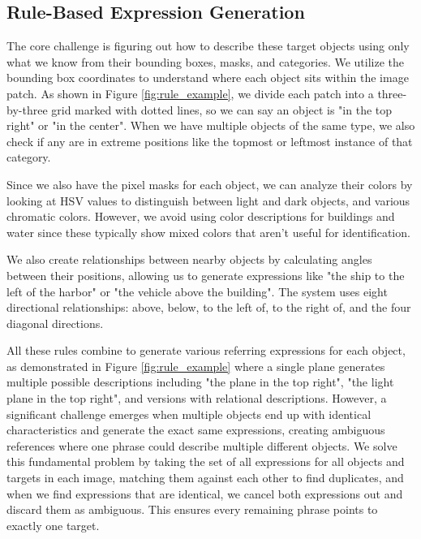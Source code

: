 \subsection{Rule-Based Expression Generation}

The core challenge is figuring out how to describe these target objects using only what we know from their bounding boxes, masks, and categories. We utilize the bounding box coordinates to understand where each object sits within the image patch. As shown in Figure \ref{fig:rule_example}, we divide each patch into a three-by-three grid marked with dotted lines, so we can say an object is "in the top right" or "in the center". When we have multiple objects of the same type, we also check if any are in extreme positions like the topmost or leftmost instance of that category.

Since we also have the pixel masks for each object, we can analyze their colors by looking at HSV values to distinguish between light and dark objects, and various chromatic colors. However, we avoid using color descriptions for buildings and water since these typically show mixed colors that aren't useful for identification.

We also create relationships between nearby objects by calculating angles between their positions, allowing us to generate expressions like "the ship to the left of the harbor" or "the vehicle above the building". The system uses eight directional relationships: above, below, to the left of, to the right of, and the four diagonal directions.

All these rules combine to generate various referring expressions for each object, as demonstrated in Figure \ref{fig:rule_example} where a single plane generates multiple possible descriptions including "the plane in the top right", "the light plane in the top right", and versions with relational descriptions. However, a significant challenge emerges when multiple objects end up with identical characteristics and generate the exact same expressions, creating ambiguous references where one phrase could describe multiple different objects. We solve this fundamental problem by taking the set of all expressions for all objects and targets in each image, matching them against each other to find duplicates, and when we find expressions that are identical, we cancel both expressions out and discard them as ambiguous. This ensures every remaining phrase points to exactly one target.

